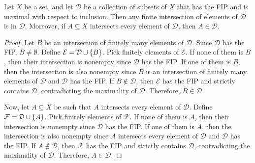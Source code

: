 \begin{lm}
    \label{lm:tychonoff-lm2}
    Let $X$ be a set, and let $\mathcal D$ be a collection of subsets of $X$ that has the FIP and is maximal with respect to inclusion. Then any finite intersection of elements of $\mathcal D$ is in $\mathcal D$. Moreover, if $A \subseteq X$ intersects every element of $\mathcal D$, then $A \in \mathcal D$.
    \begin{proof}
        Let $B$ be an intersection of finitely many elements of $\mathcal D$. Since $\mathcal D$ has the FIP, $B \neq \emptyset$. Define $\mathcal E = \mathcal D \cup {\left\{{B}\right\}}$. Pick finitely elements of $\mathcal E$. If none of them is $B$, then their intersection is nonempty since $\mathcal D$ has the FIP. If one of them is $B$, then the intersection is also nonempty since $B$ is an intersection of finitely many elements of $\mathcal D$ and $\mathcal D$ has the FIP. If $B \notin \mathcal D$, then $\mathcal E$ has the FIP and strictly contains $\mathcal D$, contradicting the maximality of $\mathcal D$. Therefore, $B \in \mathcal D$.

        Now, let $A \subseteq X$ be such that $A$ intersects every element of $\mathcal D$. Define $\mathcal F = \mathcal D \cup {\left\{{A}\right\}}$. Pick finitely elements of $\mathcal F$. If none of them is $A$, then their intersection is nonempty since $\mathcal D$ has the FIP. If one of them is $A$, then the intersection is also nonempty since $A$ intersects every element of $\mathcal D$ and $\mathcal D$ has the FIP. If $A \notin \mathcal D$, then $\mathcal F$ has the FIP and strictly contains $\mathcal D$, contradicting the maximality of $\mathcal D$. Therefore, $A \in \mathcal D$.
    \end{proof}
\end{lm}

